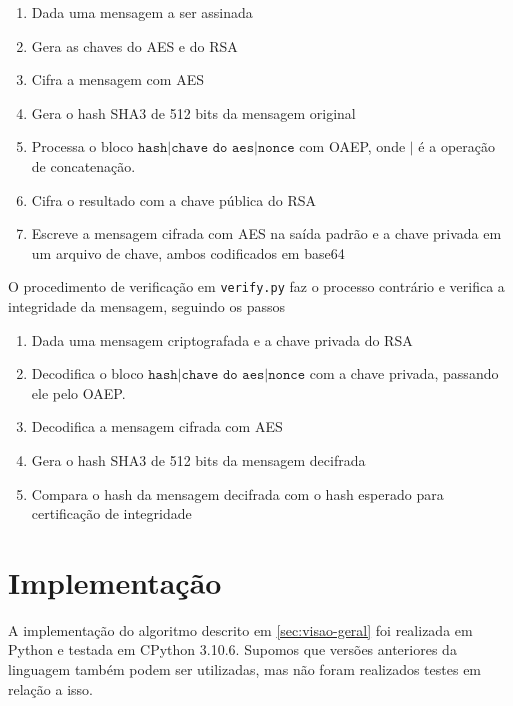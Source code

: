 \documentclass[a4paper, 10.5pt]{article}
\begin{document}
    \begin{enumerate}
        \item Dada uma mensagem a ser assinada
        \item Gera as chaves do AES e do RSA
        \item Cifra a mensagem com AES
        \item Gera o hash SHA3 de 512 bits da mensagem original
        \item Processa o bloco $\texttt{hash} | \texttt{chave do aes} | \texttt{nonce} $
            com OAEP, onde $|$ é a operação de concatenação.
        \item Cifra o resultado com a chave pública do RSA
        \item Escreve a mensagem cifrada com AES na saída padrão e a chave
            privada em um arquivo de chave, ambos codificados em base64
    \end{enumerate}

    O procedimento de verificação em \verb|verify.py| faz o processo contrário e
    verifica a integridade da mensagem, seguindo os passos

    \begin{enumerate}
        \item Dada uma mensagem criptografada e a chave privada do RSA
        \item Decodifica o bloco $\texttt{hash} | \texttt{chave do aes} | \texttt{nonce} $
            com a chave privada, passando ele pelo OAEP.
        \item Decodifica a mensagem cifrada com AES
        \item Gera o hash SHA3 de 512 bits da mensagem decifrada
        \item Compara o hash da mensagem decifrada com o hash esperado para
            certificação de integridade
    \end{enumerate}

\section{Implementação} %
\label{sec:implementacao}
    A implementação do algoritmo descrito em \ref{sec:visao-geral} foi realizada
    em Python e testada em CPython 3.10.6. Supomos que versões anteriores da linguagem
    também podem ser utilizadas, mas não foram realizados testes em relação a
    isso.
\end{document}
